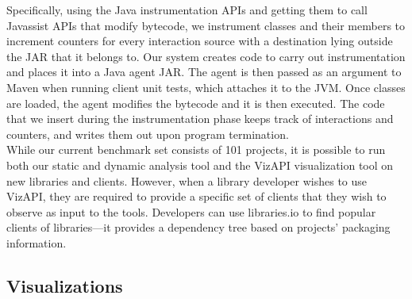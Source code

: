 Specifically, using the Java instrumentation APIs and getting them to call Javassist APIs that modify bytecode,
we instrument classes and their members to increment counters for every interaction source
with a destination lying outside the JAR that it belongs to.
Our system creates code to carry out instrumentation and places it into a Java agent JAR.
The agent is then passed as an argument to Maven when running client unit tests, which attaches it to the JVM.
Once classes are loaded, the agent modifies the bytecode and it is then executed.
The code that we insert during the instrumentation phase keeps track of interactions and counters,
and writes them out upon program termination. \\


While our current benchmark set consists of 101 projects, it is possible to run both our static and dynamic analysis tool and the VizAPI visualization tool on new libraries and clients. However, when a library developer wishes to use VizAPI, they are required to provide a specific set of clients that they wish to observe as input to the tools. Developers can use libraries.io to find popular clients of libraries---it provides a dependency tree based on projects' packaging information.


\subsection{Visualizations}
\label{subsec:vis-system}

